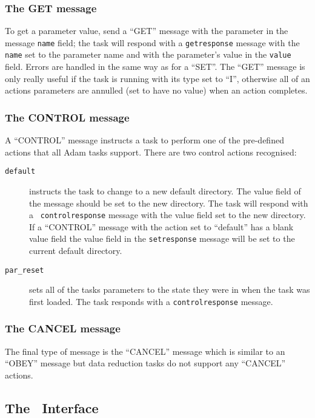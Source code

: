 \subsubsection{The GET message}

To get a parameter value, send a ``GET'' message with the parameter in the
message {\tt name} field; the task will respond with a {\tt getresponse}
message with the {\tt name} set to the parameter name and with the
parameter's value in the {\tt value} field. Errors are handled in the same
way as for a ``SET''. The ``GET'' message is only really useful if the task
is running with its type set to ``I'', otherwise all of an actions parameters
are annulled (set to have no value) when an action completes.

\subsubsection{The CONTROL message}

A ``CONTROL'' message instructs a task to perform one of the pre-defined
actions that all Adam tasks support. There are two control actions recognised:
\begin{description}
\item[{\tt default}] instructs the task to
change to a new default directory. The value field of the message should
be set to the new directory. The task will respond with a {\tt
controlresponse} message with the value field set to the new directory.
If a ``CONTROL'' message with the action set to ``default'' has a blank value
field the value field in the {\tt setresponse} message will be set to the
current default directory.
\item[{\tt par\_reset}] sets all of the tasks parameters to the
state they were in when the task was first loaded. The task responds with
a {\tt controlresponse} message.
\end{description}

\subsubsection{The CANCEL message}
The final type of message is the ``CANCEL'' message which is similar to an
``OBEY'' message but data reduction tasks do not support any ``CANCEL''
actions.

\subsection{\label{tcltk_interface}The \TclTk\ Interface}

